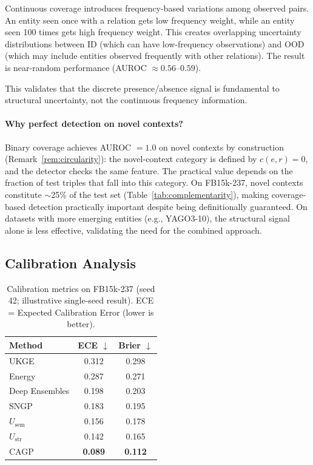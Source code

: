 \documentclass{article}
\begin{document}
Continuous coverage introduces frequency-based variations among observed pairs. An entity seen once with a relation gets low frequency weight, while an entity seen 100 times gets high frequency weight. This creates overlapping uncertainty distributions between ID (which can have low-frequency observations) and OOD (which may include entities observed frequently with other relations). The result is near-random performance (AUROC $\approx 0.56$--$0.59$).

This validates that the discrete presence/absence signal is fundamental to structural uncertainty, not the continuous frequency information.

\paragraph{Why perfect detection on novel contexts?}
Binary coverage achieves AUROC $= 1.0$ on novel contexts by construction (Remark~\ref{rem:circularity}): the novel-context category is defined by $c(e,r) = 0$, and the detector checks the same feature.
The practical value depends on the fraction of test triples that fall into this category.
On FB15k-237, novel contexts constitute $\sim$25\% of the test set (Table~\ref{tab:complementarity}), making coverage-based detection practically important despite being definitionally guaranteed.
On datasets with more emerging entities (e.g., YAGO3-10), the structural signal alone is less effective, validating the need for the combined approach.

\subsection{Calibration Analysis}
\label{app:calibration}

\begin{table}[ht]
\centering
\caption{Calibration metrics on FB15k-237 (seed 42; illustrative single-seed result). ECE = Expected Calibration Error (lower is better).}
\begin{tabular}{lcc}
\toprule
Method & ECE $\downarrow$ & Brier $\downarrow$ \\
\midrule
UKGE & 0.312 & 0.298 \\
Energy & 0.287 & 0.271 \\
Deep Ensembles & 0.198 & 0.203 \\
SNGP & 0.183 & 0.195 \\
$U_{\text{sem}}$ & 0.156 & 0.178 \\
$U_{\text{str}}$ & 0.142 & 0.165 \\
CAGP & \textbf{0.089} & \textbf{0.112} \\
\bottomrule
\end{tabular}
\end{table}
\end{document}
